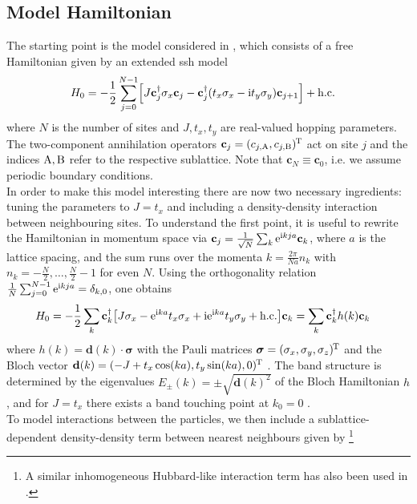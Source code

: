 \subsection{Model Hamiltonian}\label{sec:ell:bos:model_hamilton}
The starting point is the model considered in \cite{EP_DynamicInduced_Quenched_Lehmann_2021}, which consists of a free Hamiltonian given by an extended \gls{ssh} model
\begin{align*}
H_0 &= -\frac{1}{2} \sum_{j=0}^{N-1} \klb*{J \textbf{c}_j^\dagger \sigma_x \textbf{c}_j - \textbf{c}_j^\dagger \kla*{t_x\sigma_x - \i t_y \sigma_y} \textbf{c}_{j+1}} + \hc
\end{align*}
where $N$ is the number of sites and $J,t_x,t_y$ are real-valued hopping parameters.
The two-component annihilation operators $\textbf{c}_j = (c_{j,\text{A}}, c_{j,\text{B}})^{\mkern-1.5mu\text{T}}$ act on site $j$ and the indices $\text{A},\text{B}$ refer to the respective sublattice.
Note that $\textbf{c}_{N} \equiv \textbf{c}_0$, i.e. we assume periodic boundary conditions.\\
In order to make this model interesting there are now two necessary ingredients: tuning the parameters to $J=t_x$ and including a density-density interaction between neighbouring sites.
To understand the first point, it is useful to rewrite the Hamiltonian in momentum space via $\textbf{c}_j = \frac{1}{\sqrt{N}} \sum_k \text{e}^{\text{i} kja} \textbf{c}_k$, where $a$ is the lattice spacing, and the sum runs over the momenta $k=\frac{2\pi}{Na} n_k$ with $n_k=-\frac{N}{2},\dots,\frac{N}{2}-1$ for even $N$.
Using the orthogonality relation $ \frac{1}{N}\sum_{j=0}^{N-1} \text{e}^{\text{i} kja} = \delta_{k,0}$, one obtains
\begin{align*}
H_0 &= -\frac{1}{2} \sum_{k} \textbf{c}_{k}^\dagger \klb*{J \sigma_x - \powe{\i ka} t_x \sigma_x + \i \powe{\i ka} t_y \sigma_y + \hc} \textbf{c}_k = \sum_k \textbf{c}_k^\dagger h(k) \textbf{c}_k
\end{align*}
where $h(k) = \textbf{d}(k) \cdot \bm{\sigma}$ with the Pauli matrices $\bm{\sigma} = (\sigma_x, \sigma_y, \sigma_z)^{\mkern-1.5mu\text{T}}$ and the Bloch vector $\textbf{d}(k) = (-J + t_x\cos(ka), t_y\sin(ka), 0)^{\mkern-1.5mu\text{T}}$ \cite{EP_DynamicInduced_Quenched_Lehmann_2021}.
The band structure is determined by the eigenvalues $E_\pm(k) = \pm \sqrt{\textbf{d}(k)^2}$ of the Bloch Hamiltonian $h$, and for $J=t_x$ there exists a band touching point at $k_0=0$ \cite{EP_DynamicInduced_Quenched_Lehmann_2021}.\\
To model interactions between the particles, we then include a sublattice-dependent density-density term between nearest neighbours given by \cite{EP_DynamicInduced_Quenched_Lehmann_2021,NH_SkinEffect_QuasiParticles_NNint_Micallo_2023}\footnote{A similar inhomogeneous Hubbard-like interaction term has also been used in \cite{NHT_SymmetryProtectedExceptRings_Chiral_Yoshida_2019}.}
